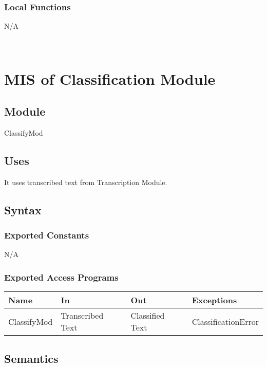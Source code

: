 \documentclass[12pt, titlepage]{article}
\begin{document}
\subsubsection{Local Functions}

N/A

\newpage
~\newpage
  
\section{MIS of Classification Module} \label{Classify} 

\subsection{Module}

ClassifyMod

\subsection{Uses}

It uses transcribed text from Transcription Module.

\subsection{Syntax}

\subsubsection{Exported Constants}

N/A

\subsubsection{Exported Access Programs}

\begin{center}
\begin{tabular}{p{2cm} p{4cm} p{4cm} p{2cm}}
\hline
\textbf{Name} & \textbf{In} & \textbf{Out} & \textbf{Exceptions} \\
\hline
ClassifyMod & Transcribed Text & Classified Text & ClassificationError & \\
\hline
\end{tabular}
\end{center}

\subsection{Semantics}
\end{document}
